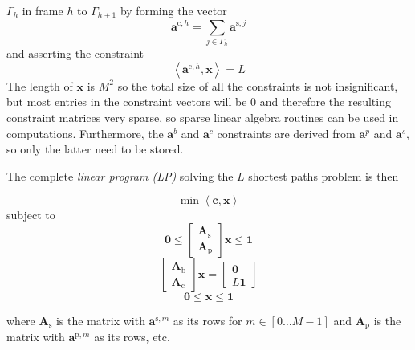 $\Gamma_{h}$ in frame $h$ to $\Gamma_{h+1}$ by forming the vector
\[
    \boldsymbol{a}^{\text{c},h} = \sum_{j \in \Gamma_{h}}
    \boldsymbol{a}^{\text{s},j}
\]
and asserting the constraint
\[
    \left\langle \boldsymbol{a}^{\text{c},h} , \boldsymbol{x} \right\rangle = L
\]
The length of $\boldsymbol{x}$ is $M^{2}$ so the total size of all the
constraints is not insignificant, but most entries in the constraint vectors will
be 0 and therefore the resulting constraint matrices very sparse, so sparse
linear algebra routines can be used in computations. Furthermore, the
$\boldsymbol{a}^{b}$ and $\boldsymbol{a}^{c}$ constraints are derived from
$\boldsymbol{a}^{p}$ and $\boldsymbol{a}^{s}$, so only the latter need to be
stored.

The complete \textit{linear program (LP)} solving the $L$ shortest paths problem is then
\begin{samepage}
\[
        \min \left\langle \boldsymbol{c}, \boldsymbol{x} \right\rangle
\]
subject to
\[
    \boldsymbol{0} \leq
    \begin{bmatrix}
        \boldsymbol{A}_{\text{s}} \\
        \boldsymbol{A}_{\text{p}}
    \end{bmatrix} \boldsymbol{x}
    \leq \boldsymbol{1}
\]
\[
    \begin{bmatrix}
        \boldsymbol{A}_{\text{b}} \\
        \boldsymbol{A}_{\text{c}}
    \end{bmatrix}
    \boldsymbol{x}
    =
    \begin{bmatrix}
        \boldsymbol{0} \\
        L\boldsymbol{1}
    \end{bmatrix}
\]
\[
    \boldsymbol{0} \leq \boldsymbol{x} \leq \boldsymbol{1}
\]
\end{samepage}
where $\boldsymbol{A}_{\text{s}}$ is the matrix with
$\boldsymbol{a}^{\text{s},m}$ as its rows for $m \in [0 \dotsc M-1]$ and
$\boldsymbol{A}_{\text{p}}$ is the matrix with $\boldsymbol{a}^{\text{p},m}$ as
its rows, etc.

